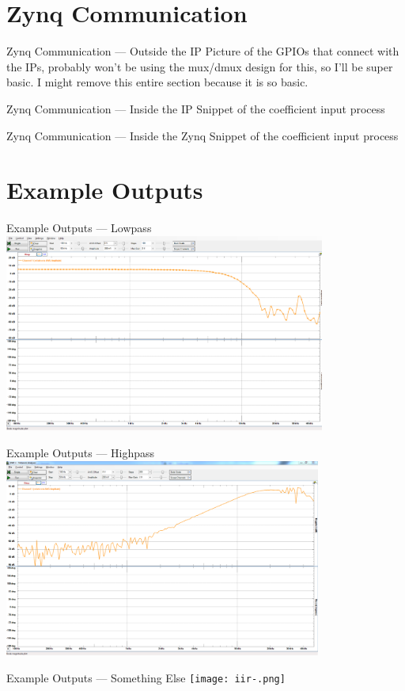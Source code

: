 \documentclass{beamer}
\begin{document}
\section{Zynq Communication}
\begin{frame}{Zynq Communication --- Outside the IP}
  Picture of the GPIOs that connect with the IPs, probably won't be using the
  mux/dmux design for this, so I'll be super basic. I might remove this entire
  section because it is so basic.
\end{frame}
\begin{frame}{Zynq Communication --- Inside the IP}
  Snippet of the coefficient input process
\end{frame}
\begin{frame}{Zynq Communication --- Inside the Zynq}
  Snippet of the coefficient input process
\end{frame}

\section{Example Outputs}
\begin{frame}{Example Outputs --- Lowpass}
  \includegraphics[height=6.5cm]
                  {very-nice-8th-order-lowpass.png}
\end{frame}
\begin{frame}{Example Outputs --- Highpass}
  \includegraphics[height=6.5cm]
                  {iir-highpass-test2.png}
\end{frame}
\begin{frame}{Example Outputs --- Something Else}
  \texttt{[image: iir-.png]}
\end{frame}
\end{document}

